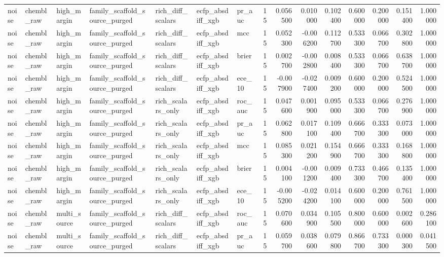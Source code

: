 \begin{longtable}{lllllllrrrrrrrr}
noise & chembl\_raw & high\_margin & family\_scaffold\_source\_purged & rich\_diff\_scalars & ecfp\_absdiff\_xgb & pr\_auc & 15 & 0.056500 & 0.010000 & 0.102400 & 0.600000 & 0.200000 & 0.151400 & 1.000000 \\
noise & chembl\_raw & high\_margin & family\_scaffold\_source\_purged & rich\_diff\_scalars & ecfp\_absdiff\_xgb & mcc & 15 & 0.052300 & -0.006200 & 0.112700 & 0.533300 & 0.066700 & 0.302800 & 1.000000 \\
noise & chembl\_raw & high\_margin & family\_scaffold\_source\_purged & rich\_diff\_scalars & ecfp\_absdiff\_xgb & brier & 15 & 0.002700 & -0.002800 & 0.008400 & 0.533300 & 0.066700 & 0.638700 & 1.000000 \\
noise & chembl\_raw & high\_margin & family\_scaffold\_source\_purged & rich\_diff\_scalars & ecfp\_absdiff\_xgb & ece\_10 & 15 & -0.007900 & -0.027400 & 0.009200 & 0.600000 & 0.200000 & 0.524500 & 1.000000 \\
noise & chembl\_raw & high\_margin & family\_scaffold\_source\_purged & rich\_scalars\_only & ecfp\_absdiff\_xgb & roc\_auc & 15 & 0.047600 & 0.001900 & 0.095000 & 0.533300 & 0.066700 & 0.276900 & 1.000000 \\
noise & chembl\_raw & high\_margin & family\_scaffold\_source\_purged & rich\_scalars\_only & ecfp\_absdiff\_xgb & pr\_auc & 15 & 0.062800 & 0.017100 & 0.109400 & 0.666700 & 0.333300 & 0.073000 & 1.000000 \\
noise & chembl\_raw & high\_margin & family\_scaffold\_source\_purged & rich\_scalars\_only & ecfp\_absdiff\_xgb & mcc & 15 & 0.085300 & 0.021200 & 0.154900 & 0.666700 & 0.333300 & 0.168800 & 1.000000 \\
noise & chembl\_raw & high\_margin & family\_scaffold\_source\_purged & rich\_scalars\_only & ecfp\_absdiff\_xgb & brier & 15 & 0.004100 & -0.001200 & 0.009400 & 0.733300 & 0.466700 & 0.135400 & 1.000000 \\
noise & chembl\_raw & high\_margin & family\_scaffold\_source\_purged & rich\_scalars\_only & ecfp\_absdiff\_xgb & ece\_10 & 15 & -0.005200 & -0.024200 & 0.014100 & 0.600000 & 0.200000 & 0.761500 & 1.000000 \\
noise & chembl\_raw & multi\_source & family\_scaffold\_source\_purged & rich\_diff\_scalars & ecfp\_absdiff\_xgb & roc\_auc & 15 & 0.070600 & 0.034900 & 0.105500 & 0.800000 & 0.600000 & 0.002600 & 0.286100 \\
noise & chembl\_raw & multi\_source & family\_scaffold\_source\_purged & rich\_diff\_scalars & ecfp\_absdiff\_xgb & pr\_auc & 15 & 0.059700 & 0.038600 & 0.079800 & 0.866700 & 0.733300 & 0.000300 & 0.041500 \\

\end{longtable}
